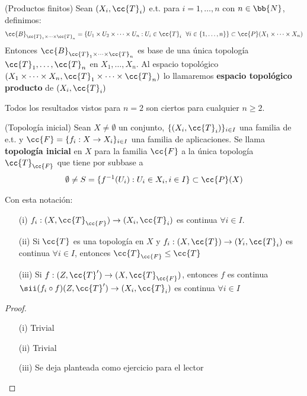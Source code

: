 \begin{definicion}
    (Productos finitos) Sean $(X_i, \cc{T}_i)$ e.t. para $i=1,\dots,n$ con $n\in \bb{N}$, definimos:
    \begin{align*}
        \cc{B}_{\cc{T}_1 \times \dots \times \cc{T}_n}= \{U_1 \times U_2 \times \dots \times U_n : U_i \in \cc{T}_i\ \ \forall i \in\{1,\dots,n\} \} \subset \cc{P}(X_1 \times \dots \times X_n)
    \end{align*}
    Entonces $\cc{B}_{\cc{T}_1 \times \dots \times \cc{T}_n}$ es base de una única topología $\cc{T}_1, \dots, \cc{T}_n$ en $X_1, \dots, X_n$. Al espacio topológico $(X_1\times \dots \times X_n, \cc{T}_1 \times \dots \times \cc{T}_n)$ lo llamaremos \textbf{espacio topológico producto} de $(X_i, \cc{T}_i)$
    \endsquare
\end{definicion}

\begin{observacion}
    Todos los resultados vistos para $n=2$ son ciertos para cualquier $n\geq 2$.
    \endsquare
\end{observacion}

\begin{definicion}
    (Topología inicial) Sean $X\neq \emptyset$ un conjunto, $\{(X_i, \cc{T}_i)\}_{i\in I}$ una familia de e.t. y $\cc{F}=\{f_i:X \to X_i\}_{i\in I}$ una familia de aplicaciones. Se llama \textbf{topología inicial} en $X$ para la familia $\cc{F}$ a la única topología $\cc{T}_{\cc{F}}$ que tiene por subbase a 
    \begin{gather*}
        \emptyset \neq S = \{f^{-1}(U_i) : U_i \in X_i, i\in I\} \subset \cc{P}(X)
    \end{gather*}
    \endsquare
\end{definicion}

\begin{prop}
    Con esta notación:
    \begin{enumerate}
        \item[(i)] $f_i:(X, \cc{T}_{\cc{F}}) \to (X_i, \cc{T}_i)$ es continua $\forall i \in I$.
        \item[(ii)] Si $\cc{T}$ es una topología en $X$ y $f_i:(X, \cc{T})\to (Y_i, \cc{T}_i)$ es continua $\forall i\in I$, entonces $\cc{T}_{\cc{F}}\leq \cc{T}$
        \item[(iii)] Si $f:(Z, \cc{T}')\to (X, \cc{T}_{\cc{F}})$, entonces $f$ es continua $\sii (f_i\circ f)(Z, \cc{T}') \to (X_i, \cc{T}_i)$ es continua $\forall i \in I$
    \end{enumerate}
    \begin{proof}\
        \begin{enumerate}
            \item[(i)] Trivial
            \item[(ii)] Trivial
            \item[(iii)] Se deja planteada como ejercicio para el lector %
        \end{enumerate}
    \end{proof}
\end{prop}

